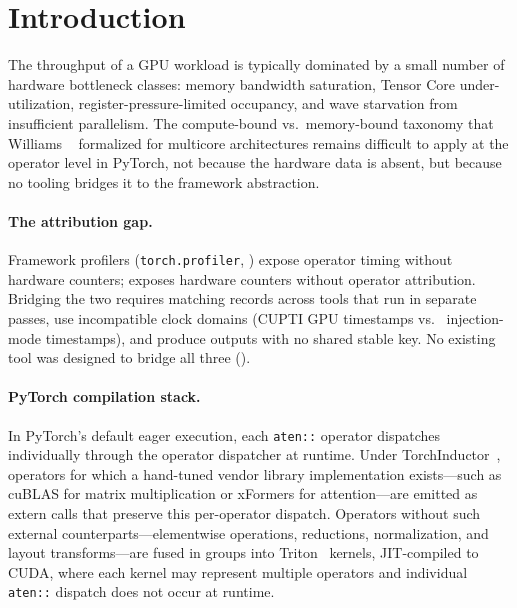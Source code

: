 ﻿\section{Introduction}
\label{sec:intro}

The throughput of a GPU workload is typically dominated by a small number of hardware bottleneck
classes: memory bandwidth saturation, Tensor Core under-utilization, register-pressure-limited
occupancy, and wave starvation from insufficient parallelism. The compute-bound vs.\ memory-bound
taxonomy that Williams \etal~\cite{williams2009roofline} formalized for multicore architectures
remains difficult to apply at the operator level in PyTorch, not because the hardware data is
absent, but because no tooling bridges it to the framework abstraction.

\paragraph{The attribution gap.}
Framework profilers (\texttt{torch.profiler}, \nsys)
expose operator timing without hardware counters; \ncu exposes hardware
counters without operator attribution. Bridging the two requires matching records across tools
that run in separate passes, use incompatible clock domains (CUPTI GPU timestamps vs.\ \ncu
injection-mode timestamps), and produce outputs with no shared stable key. No existing tool was designed to bridge all three ().

\paragraph{PyTorch compilation stack.}
In PyTorch's default eager execution, each \texttt{aten::} operator dispatches individually
through the operator dispatcher at runtime. Under TorchInductor~\cite{pytorch2024}, operators
for which a hand-tuned vendor library implementation exists---such as cuBLAS for matrix
multiplication or xFormers for attention---are emitted as extern calls that
preserve this per-operator dispatch. Operators without such external counterparts---elementwise
operations, reductions, normalization, and layout transforms---are fused in groups into
Triton~\cite{triton2019} kernels, JIT-compiled to CUDA, where each kernel may represent
multiple operators and individual \texttt{aten::} dispatch does not occur at runtime.


